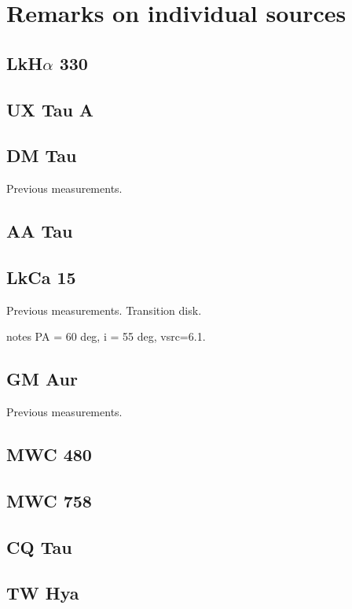 \documentclass[iop,floatfix,numberedappendix,twocolappendix]{emulateapj}
\begin{document}



\appendix

\section{Remarks on individual sources}

\subsection{LkH$\alpha$ 330}


\subsection{UX Tau A}

\subsection{DM Tau}
Previous measurements.

\subsection{AA Tau}

\subsection{LkCa 15}
Previous measurements. Transition disk.

\citep{vandermarel15} notes PA = 60 deg, i = 55 deg,  vsrc=6.1.

\subsection{GM Aur}
Previous measurements.

\subsection{MWC 480}

\subsection{MWC 758}

\subsection{CQ Tau}

\subsection{TW Hya}
\end{document}
